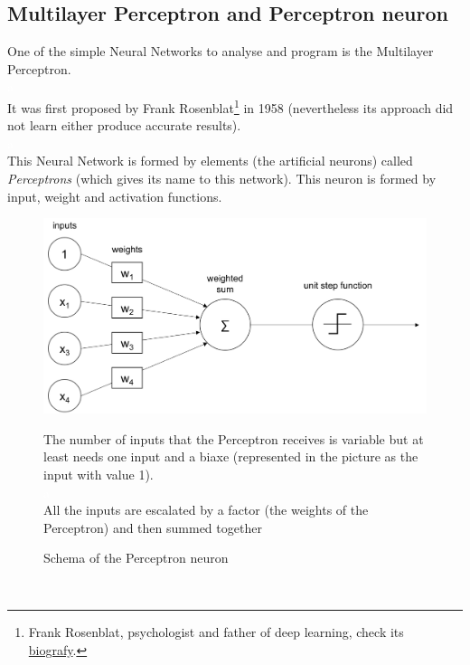 \documentclass[a4paper, 11pt]{article}
\begin{document}
\subsection{Multilayer Perceptron and Perceptron neuron}
One of the simple Neural Networks to analyse and program is the Multilayer Perceptron.\\
\textcolor{white}{a}\\
It was first proposed by Frank Rosenblat\footnote{Frank Rosenblat, psychologist and father of deep learning, check its \href{https://en.wikipedia.org/wiki/Frank_Rosenblat}{biografy}.} in 1958 (nevertheless its approach did not learn either produce accurate results).\\
\textcolor{white}{a}\\
This Neural Network is formed by elements (the artificial neurons) called \textit{Perceptrons} (which gives its name to this network). This neuron is formed by input, weight and activation functions.
\begin{figure}[h]
    \begin{minipage}{9cm}
       \begin{center}
           \includegraphics[width = 1 \textwidth]{Neural_Network/perceptron_schema.png}
           \caption{Schema of the Perceptron neuron}
       \end{center} 
    \end{minipage}
    \hspace{1em}
    \begin{minipage}{5cm}
        The number of inputs that the Perceptron receives is variable but at least needs one input and a biaxe (represented in the picture as the input with value 1).\\
        \textcolor{white}{a}\\
        All the inputs are escalated by a factor (the weights of the Perceptron) and then summed together
    \end{minipage}
\end{figure}\\
\end{document}
